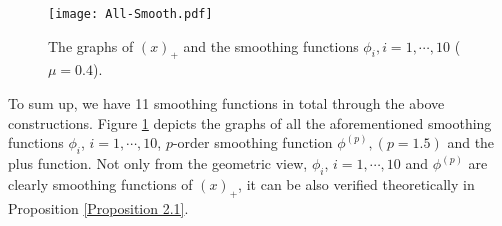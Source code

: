 \documentclass[12pt]{article}
\begin{document}
 \begin{figure}
 \centering
 \texttt{[image: All-Smooth.pdf]}\\
 \caption{The graphs of $(x)_+$ and the smoothing functions $\phi_i, i=1,\cdots,10$
 ($\mu=0.4$).}\label{All-Smooth}
 \end{figure}



 To sum up, we have 11 smoothing functions in total through the above
 constructions. Figure \ref{All-Smooth} depicts the graphs of all the
 aforementioned smoothing functions $\phi_i$, $i=1,\cdots,10$, $p$-order
 smoothing function $\phi^{(p)}, (p=1.5)$ and the plus function. Not only
 from the geometric view, $\phi_i$, $i=1,\cdots,10$ and $\phi^{(p)}$ are clearly smoothing
 functions of $(x)_+$, it can be also verified theoretically
 in Proposition \ref{Proposition 2.1}.
\medskip
\end{document}
